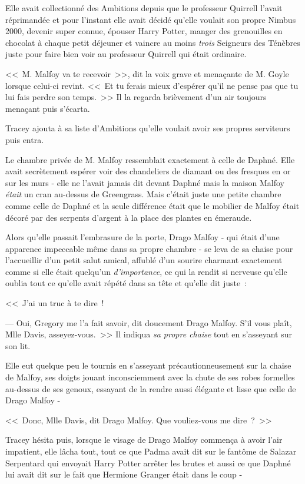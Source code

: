 Elle avait collectionné des Ambitions depuis que le professeur Quirrell l'avait réprimandée et pour l'instant elle avait décidé qu'elle voulait son propre Nimbus 2000, devenir super connue, épouser Harry Potter, manger des grenouilles en chocolat à chaque petit déjeuner et vaincre au moins \emph{trois} Seigneurs des Ténèbres juste pour faire bien voir au professeur Quirrell qui était ordinaire.

<<~M. Malfoy va te recevoir~>>, dit la voix grave et menaçante de M. Goyle lorsque celui-ci revint. <<~Et tu ferais mieux d'espérer qu'il ne pense pas que tu lui fais perdre son temps.~>> Il la regarda brièvement d'un air toujours menaçant puis s'écarta.

Tracey ajouta à sa liste d'Ambitions qu'elle voulait avoir ses propres serviteurs puis entra.

Le chambre privée de M. Malfoy ressemblait exactement à celle de Daphné. Elle avait secrètement espérer voir des chandeliers de diamant ou des fresques en or sur les murs - elle ne l'avait jamais dit devant Daphné mais la maison Malfoy \emph{était} un cran au-dessus de Greengrass. Mais c'était juste une petite chambre comme celle de Daphné et la seule différence était que le mobilier de Malfoy était décoré par des serpents d'argent à la place des plantes en émeraude.

Alors qu'elle passait l'embrasure de la porte, Drago Malfoy - qui était d'une apparence impeccable même dans sa propre chambre - se leva de sa chaise pour l'accueillir d'un petit salut amical, affublé d'un sourire charmant exactement comme si elle était quelqu'un \emph{d'importance}, ce qui la rendit si nerveuse qu'elle oublia tout ce qu'elle avait répété dans sa tête et qu'elle dit juste~:

<<~J'ai un truc à te dire~!

--- Oui, Gregory me l'a fait savoir, dit doucement Drago Malfoy. S'il vous plaît, Mlle Davis, asseyez-vous.~>> Il indiqua \emph{sa propre chaise} tout en s'asseyant sur son lit.

Elle eut quelque peu le tournis en s'asseyant précautionneusement sur la chaise de Malfoy, ses doigts jouant inconsciemment avec la chute de ses robes formelles au-dessus de ses genoux, essayant de la rendre aussi élégante et lisse que celle de Drago Malfoy -

<<~Donc, Mlle Davis, dit Drago Malfoy. Que vouliez-vous me dire~?~>>

Tracey hésita puis, lorsque le visage de Drago Malfoy commença à avoir l'air impatient, elle lâcha tout, tout ce que Padma avait dit sur le fantôme de Salazar Serpentard qui envoyait Harry Potter arrêter les brutes et aussi ce que Daphné lui avait dit sur le fait que Hermione Granger était dans le coup -

